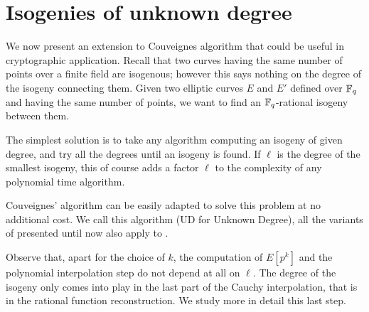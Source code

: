 

\section{Isogenies of unknown degree}
\label{sec:bounded}

We now present an extension to Couveignes algorithm that could be
useful in cryptographic application. Recall that two curves having the
same number of points over a finite field are isogenous; however this
says nothing on the degree of the isogeny connecting them. Given two
elliptic curves $E$ and $E'$ defined over $\mathbb{F}_q$ and having the same
number of points, we want to find an $\mathbb{F}_q$-rational isogeny between
them.

The simplest solution is to take any algorithm computing an isogeny of
given degree, and try all the degrees until an isogeny is found. If
$\ell$ is the degree of the smallest isogeny, this of course adds a
factor $\ell$ to the complexity of any polynomial time algorithm.

Couveignes' algorithm can be easily adapted to solve this problem at
no additional cost. We call this algorithm \ctwoud{} (UD for Unknown
Degree), all the variants of \ctwo{} presented until now also apply to
\ctwoud{}.

Observe that, apart for the choice of $k$, the computation of $E[p^k]$
and the polynomial interpolation step do not depend at all on
$\ell$. The degree of the isogeny only comes into play in the last
part of the Cauchy interpolation, that is in the rational function
reconstruction. We study more in detail this last step.


